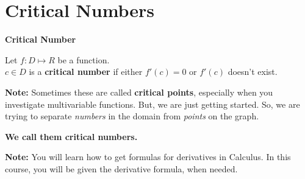 \documentclass{ximera}
\begin{document}
\section*{Critical Numbers}




\begin{idea} \textbf{\textcolor{blue!55!black}{Critical Number}}

Let $f: D \mapsto R$ be a function. \\
$c \in D$ is a \textbf{critical number} if  either $f'(c) = 0$ or $f'(c)$ doesn't exist.


\end{idea}


\textbf{Note:}  Sometimes these are called \textbf{critical points}, especially when you investigate multivariable functions.  But, we are just getting started.  So, we are trying to separate \textit{numbers} in the domain from \textit{points} on the graph. 



\begin{center}


\textbf{\textcolor{purple!85!blue}{We call them critical numbers.}}

\end{center}


\textbf{Note:} You will learn how to get formulas for derivatives in Calculus.  In this course, you will be given the derivative formula, when needed. 
\end{document}
